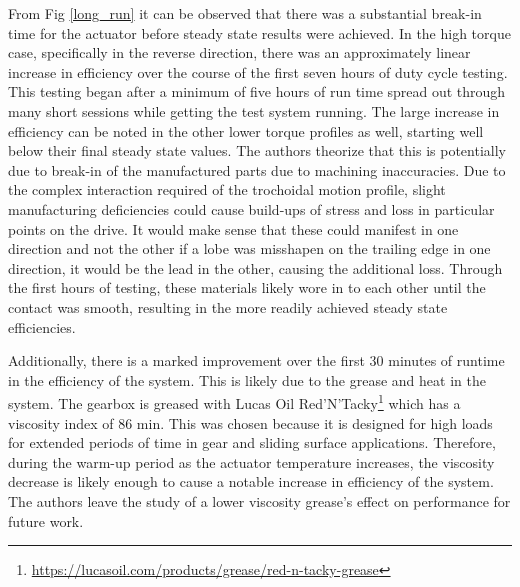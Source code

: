 From Fig \ref{long_run} it can be observed that there was a substantial break-in time for the actuator before steady state results were achieved. In the high torque case, specifically in the reverse direction, there was an approximately linear increase in efficiency over the course of the first seven hours of duty cycle testing. This testing began after a minimum of five hours of run time spread out through many short sessions while getting the test system running. The large increase in efficiency can be noted in the other lower torque profiles as well, starting well below their final steady state values. The authors theorize that this is potentially due to break-in of the manufactured parts due to machining inaccuracies. Due to the complex interaction required of the trochoidal motion profile, slight manufacturing deficiencies could cause build-ups of stress and loss in particular points on the drive. It would make sense that these could manifest in one direction and not the other if a lobe was misshapen on the trailing edge in one direction, it would be the lead in the other, causing the additional loss. Through the first hours of testing, these materials likely wore in to each other until the contact was smooth, resulting in the more readily achieved steady state efficiencies. 

Additionally, there is a marked improvement over the first 30 minutes of runtime in the efficiency of the system. This is likely due to the grease and heat in the system. The gearbox is greased with Lucas Oil Red'N'Tacky\footnote{\url{https://lucasoil.com/products/grease/red-n-tacky-grease}} which has a viscosity index of 86 min. This was chosen because it is designed for high loads for extended periods of time in gear and sliding surface applications. Therefore, during the warm-up period as the actuator temperature increases, the viscosity decrease is likely enough to cause a notable increase in efficiency of the system. The authors leave the study of a lower viscosity grease's effect on performance for future work. 
